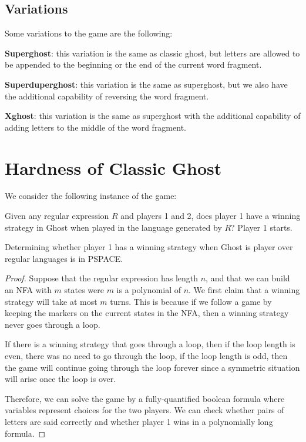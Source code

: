 \documentclass[runningheads,a4paper]{llncs}
\begin{document}
\subsection{Variations}

Some variations to the game are the following:

\textbf{Superghost}: this variation is the same as classic ghost, but letters are allowed to be appended to the beginning or the end of the current word fragment.

\textbf{Superduperghost}: this variation is the same as superghost, but we also have the additional capability of reversing the word fragment.

\textbf{Xghost}: this variation is the same as superghost with the additional capability of adding letters to the middle of the word fragment.

\section{Hardness of Classic Ghost}
\label{Hardness of Classic Ghost}

We consider the following instance of the game:

Given any regular expression $R$ and players 1 and 2, does player 1 have a winning strategy in Ghost when played in the language generated by $R$? Player 1 starts.

\begin{theorem}
Determining whether player 1 has a winning strategy when Ghost is player over regular languages is in PSPACE. 
\end{theorem}

\begin{proof}
Suppose that the regular expression has length $n$, and that we can build an NFA with $m$ states were $m$ is a polynomial of $n$. We first claim that a winning strategy will take at most $m$ turns. This is because if we follow a game by keeping the markers on the current states in the NFA, then a winning strategy never goes through a loop. 

If there is a winning strategy that goes through a loop, then if the loop length is even, there was no need to go through the loop, if the loop length is odd, then the game will continue going through the loop forever since a symmetric situation will arise once the loop is over.

Therefore, we can solve the game by a fully-quantified boolean formula where variables represent choices for the two players. We can check whether pairs of letters are said correctly and whether player 1 wins in a polynomially long formula. 
\end{proof}
\end{document}
